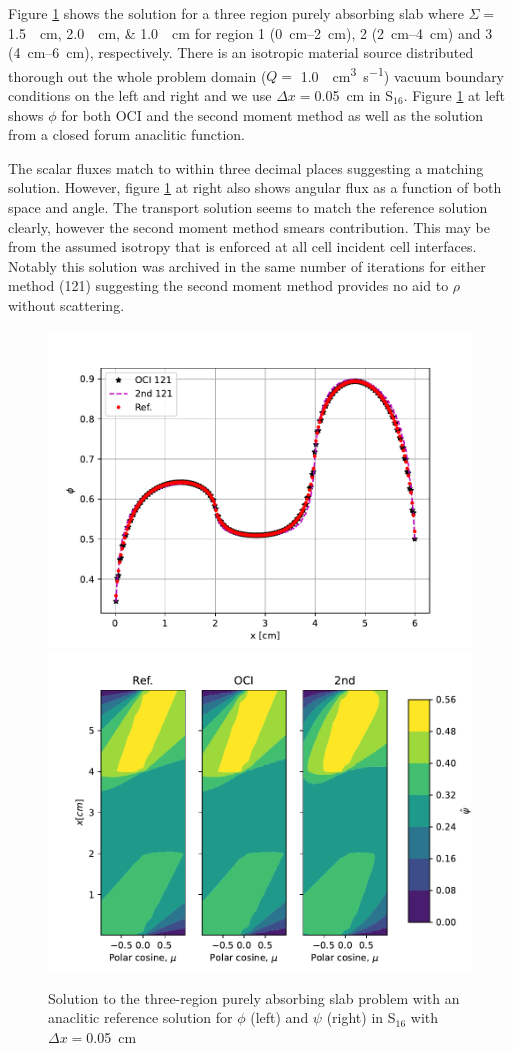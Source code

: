 Figure \ref{fig:absorbium} shows the solution for a three region purely absorbing slab where $\Sigma = $ \qtylist{1.5; 2.0; 1.0}{\per\centi\meter} for region 1 (\SI{0}{\centi\meter}--\SI{2}{\centi\meter}), 2 (\SI{2}{\centi\meter}--\SI{4}{\centi\meter}) and 3 (\SI{4}{\centi\meter}--\SI{6}{\centi\meter}), respectively.
There is an isotropic material source distributed thorough out the whole problem domain ($Q=$ \SI{1.0}{\per\centi\meter\cubed\per\s}) vacuum boundary conditions on the left and right and we use $\Delta x = $\SI{0.05}{\centi\meter} in S$_{16}$.
Figure \ref{fig:absorbium} at left shows $\phi$ for both OCI and the second moment method as well as the solution from a closed forum anaclitic function.

The scalar fluxes match to within three decimal places suggesting a matching solution.
However, figure  \ref{fig:absorbium} at right also shows angular flux as a function of both space and angle.
The transport solution seems to match the reference solution clearly, however the second moment method smears contribution.
This may be from the assumed isotropy that is enforced at all cell incident cell interfaces. 
Notably this solution was archived in the same number of iterations for either method (\num{121}) suggesting the second moment method provides no aid to $\rho$ without scattering.

\begin{figure}
    \centering
    \includegraphics[width=.49\linewidth]{figures/smm_paper/slab_abs_sf.pdf}
    \includegraphics[width=.49\linewidth]{figures/smm_paper/slab_abs_af.pdf}
    \caption{Solution to the three-region purely absorbing slab problem with an anaclitic reference solution for $\phi$ (left) and $\psi$ (right) in S$_{16}$ with $\Delta x =$\SI{0.05}{\centi\meter}}
    \label{fig:absorbium}
\end{figure}

